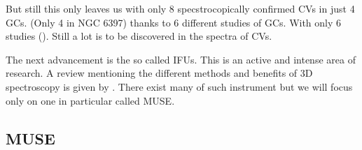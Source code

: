 But still this only leaves us with only 8 specstrocopically confirmed CVs in just 4 GCs. (Only 4 in NGC 6397) thanks to 6 different studies of GCs. With only 6 studies (). Still a lot is to be discovered in the spectra of CVs. 

The next advancement is the so called IFUs. This is an active and intense area of research. A review mentioning the different methods and benefits of 3D spectroscopy is given by \cite{bershady_3d_2009}. There exist many of such instrument but we will focus only on one in particular called MUSE. 






\subsection{MUSE}


